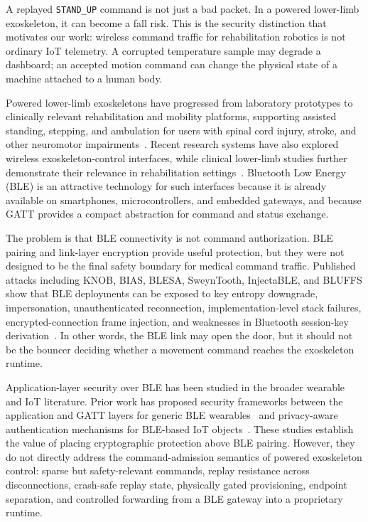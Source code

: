 \documentclass[journal]{IEEEtran}
\begin{document}
A replayed \texttt{STAND\_UP} command is not just a bad packet. In a powered lower-limb exoskeleton, it can become a fall risk. This is the security distinction that motivates our work: wireless command traffic for rehabilitation robotics is not ordinary IoT telemetry. A corrupted temperature sample may degrade a dashboard; an accepted motion command can change the physical state of a machine attached to a human body.

Powered lower-limb exoskeletons have progressed from laboratory prototypes to clinically relevant rehabilitation and mobility platforms, supporting assisted standing, stepping, and ambulation for users with spinal cord injury, stroke, and other neuromotor impairments~\cite{baud2021review,pinto2020performance}. 
Recent research systems have also explored wireless exoskeleton-control interfaces, while clinical lower-limb studies further demonstrate their relevance in rehabilitation settings~\cite{andersson2024wireless,atlas2030_2022}. 
Bluetooth Low Energy (BLE) is an attractive technology for such interfaces because it is already available on smartphones, microcontrollers, and embedded gateways, and because GATT provides a compact abstraction for command and status exchange.

The problem is that BLE connectivity is not command authorization. BLE pairing and link-layer encryption provide useful protection, but they were not designed to be the final safety boundary for medical command traffic. Published attacks including KNOB, BIAS, BLESA, SweynTooth, InjectaBLE, and BLUFFS show that BLE deployments can be exposed to key entropy downgrade, impersonation, unauthenticated reconnection, implementation-level stack failures, encrypted-connection frame injection, and weaknesses in Bluetooth session-key derivation~\cite{antonioli2020knob,antonioli2020bias,wu2020blesa,garbelini2020sweyntooth,cayre2021injectable,antonioli2023bluffs}. In other words, the BLE link may open the door, but it should not be the bouncer deciding whether a movement command reaches the exoskeleton runtime.

Application-layer security over BLE has been studied in the broader wearable and IoT literature. Prior work has proposed security frameworks between the application and GATT layers for generic BLE wearables~\cite{zhang2019bleframework} and privacy-aware authentication mechanisms for BLE-based IoT objects~\cite{cha2017bleiot}. These studies establish the value of placing cryptographic protection above BLE pairing. However, they do not directly address the command-admission semantics of powered exoskeleton control: sparse but safety-relevant commands, replay resistance across disconnections, crash-safe replay state, physically gated provisioning, endpoint separation, and controlled forwarding from a BLE gateway into a proprietary runtime.
\end{document}

